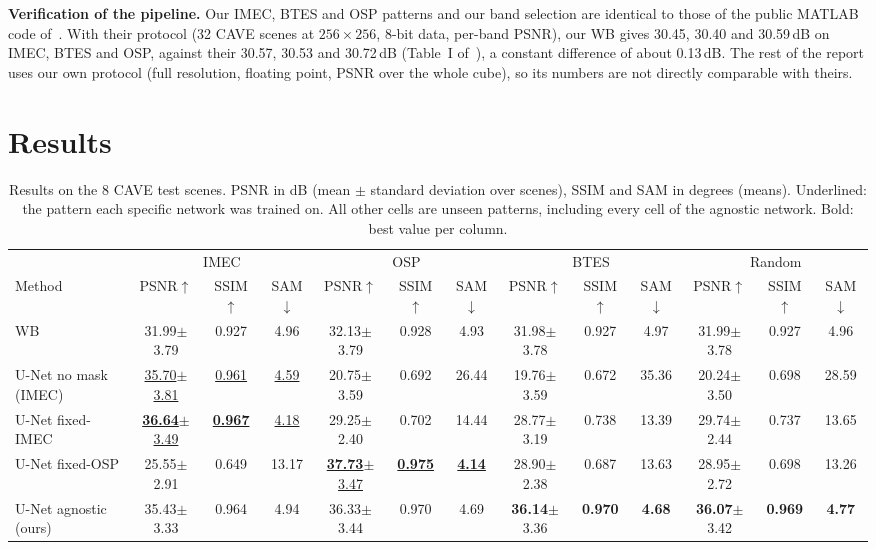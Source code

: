 \documentclass{article}
\newcommand{\seen}[1]{\underline{#1}}
\begin{document}
\textbf{Verification of the pipeline.} Our IMEC, BTES and OSP patterns and
our band selection are identical to those of the public MATLAB code
of~\cite{diaz2023}. With their protocol (32 CAVE scenes at $256\times256$,
8-bit data, per-band PSNR), our WB gives 30.45, 30.40 and 30.59\,dB on IMEC,
BTES and OSP, against their 30.57, 30.53 and 30.72\,dB (Table~I
of~\cite{diaz2023}), a constant difference of about 0.13\,dB. The rest of
the report uses our own protocol (full resolution, floating point, PSNR over
the whole cube), so its numbers are not directly comparable with theirs.

\section{Results}
\label{sec:results}

\begin{table}[t]
\centering
\caption{Results on the 8 CAVE test scenes. PSNR in dB (mean $\pm$ standard
deviation over scenes), SSIM and SAM in degrees (means). Underlined: the
pattern each specific network was trained on. All other cells are unseen
patterns, including every cell of the agnostic network. Bold: best value per
column.}
\label{tab:main}
\footnotesize
\setlength{\tabcolsep}{2.2pt}
\begin{tabular}{|l|ccc|ccc|ccc|ccc|}
\hline
& \multicolumn{3}{c|}{IMEC} & \multicolumn{3}{c|}{OSP}
& \multicolumn{3}{c|}{BTES} & \multicolumn{3}{c|}{Random} \\
Method & PSNR$\uparrow$ & SSIM$\uparrow$ & SAM$\downarrow$
       & PSNR$\uparrow$ & SSIM$\uparrow$ & SAM$\downarrow$
       & PSNR$\uparrow$ & SSIM$\uparrow$ & SAM$\downarrow$
       & PSNR$\uparrow$ & SSIM$\uparrow$ & SAM$\downarrow$ \\
\hline
WB~\cite{brauers2006}
  & 31.99$\pm$3.79 & 0.927 & 4.96
  & 32.13$\pm$3.79 & 0.928 & 4.93
  & 31.98$\pm$3.78 & 0.927 & 4.97
  & 31.99$\pm$3.78 & 0.927 & 4.96 \\
U-Net no mask (IMEC)
  & \seen{35.70$\pm$3.81} & \seen{0.961} & \seen{4.59}
  & 20.75$\pm$3.59 & 0.692 & 26.44
  & 19.76$\pm$3.59 & 0.672 & 35.36
  & 20.24$\pm$3.50 & 0.698 & 28.59 \\
U-Net fixed-IMEC
  & \seen{\textbf{36.64}$\pm$3.49} & \seen{\textbf{0.967}} & \seen{4.18}
  & 29.25$\pm$2.40 & 0.702 & 14.44
  & 28.77$\pm$3.19 & 0.738 & 13.39
  & 29.74$\pm$2.44 & 0.737 & 13.65 \\
U-Net fixed-OSP
  & 25.55$\pm$2.91 & 0.649 & 13.17
  & \seen{\textbf{37.73}$\pm$3.47} & \seen{\textbf{0.975}} & \seen{\textbf{4.14}}
  & 28.90$\pm$2.38 & 0.687 & 13.63
  & 28.95$\pm$2.72 & 0.698 & 13.26 \\
U-Net agnostic (ours)
  & 35.43$\pm$3.33 & 0.964 & 4.94
  & 36.33$\pm$3.44 & 0.970 & 4.69
  & \textbf{36.14}$\pm$3.36 & \textbf{0.970} & \textbf{4.68}
  & \textbf{36.07}$\pm$3.42 & \textbf{0.969} & \textbf{4.77} \\
\hline
\end{tabular}
\end{table}
\end{document}
